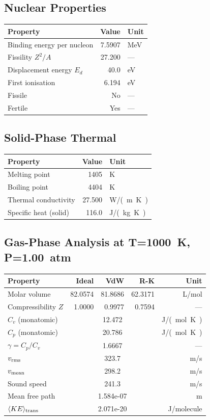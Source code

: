 \documentclass[11pt,a4paper]{article}
\begin{document}
\subsection{Nuclear Properties}
\begin{tabular}{lrl}
  \toprule
  Property & Value & Unit \\
  \midrule
  Binding energy per nucleon & 7.5907 & \si{MeV} \\
  Fissility $Z^2/A$ & 27.200 & --- \\
  Displacement energy $E_d$ & 40.0 & \si{eV} \\
  First ionisation & 6.194 & \si{eV} \\
  Fissile & No & --- \\
  Fertile & Yes & --- \\
  \bottomrule
\end{tabular}

\subsection{Solid-Phase Thermal}
\begin{tabular}{lrl}
  \toprule
  Property & Value & Unit \\
  \midrule
  Melting point & 1405 & \si{K} \\
  Boiling point & 4404 & \si{K} \\
  Thermal conductivity & 27.500 & \si{W/(m.K)} \\
  Specific heat (solid) & 116.0 & \si{J/(kg.K)} \\
  \bottomrule
\end{tabular}

\subsection{Gas-Phase Analysis at T=\SI{1000}{K}, P=\SI{1.00}{atm}}
\begin{tabular}{lrrrr}
  \toprule
  Property & Ideal & VdW & R-K & Unit \\
  \midrule
  Molar volume & 82.0574 & 81.8686 & 62.3171 & \si{L/mol} \\
  Compressibility $Z$ & 1.0000 & 0.9977 & 0.7594 & --- \\
  \midrule
  $C_v$ (monatomic) & \multicolumn{3}{c}{12.472} & \si{J/(mol.K)} \\
  $C_p$ (monatomic) & \multicolumn{3}{c}{20.786} & \si{J/(mol.K)} \\
  $\gamma = C_p/C_v$ & \multicolumn{3}{c}{1.6667} & --- \\
  $v_{\rm rms}$ & \multicolumn{3}{c}{323.7} & \si{m/s} \\
  $v_{\rm mean}$ & \multicolumn{3}{c}{298.2} & \si{m/s} \\
  Sound speed & \multicolumn{3}{c}{241.3} & \si{m/s} \\
  Mean free path & \multicolumn{3}{c}{1.584e-07} & \si{m} \\
  $\langle KE \rangle_{\rm trans}$ & \multicolumn{3}{c}{2.071e-20} & \si{J/molecule} \\
  \bottomrule
\end{tabular}
\end{document}
